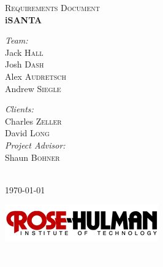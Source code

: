 \documentclass[11pt]{article}
\begin{document}
\begin{titlepage}
\begin{center}
\textsc{\Large Requirements Document}\\[0.5cm]
{ \Huge \bfseries iSANTA}\\[0.4cm]

\begin{minipage}{0.4\textwidth}
\begin{flushleft} \large
\emph{Team:}\\
Jack \textsc{Hall}\\
Josh \textsc{Dash}\\
Alex \textsc{Audretsch}\\
Andrew \textsc{Siegle}\\
\end{flushleft}
\end{minipage}
\begin{minipage}{0.4\textwidth}
\begin{flushright} \large
\emph{Clients:} \\
Charles \textsc{Zeller}\\
David \textsc{Long}\\
\emph{Project Advisor:}\\
Shaun \textsc{Bohner}
\end{flushright}
\end{minipage}
\\[1cm]
{\large \today}

\begin{center}
\includegraphics[scale = 4, angle = 0]{Rose-HulmanLogo.png}
\end{center}
\textcolor{white}{.}%
\\[3cm]

\end{center}

\end{titlepage}
\end{document}

